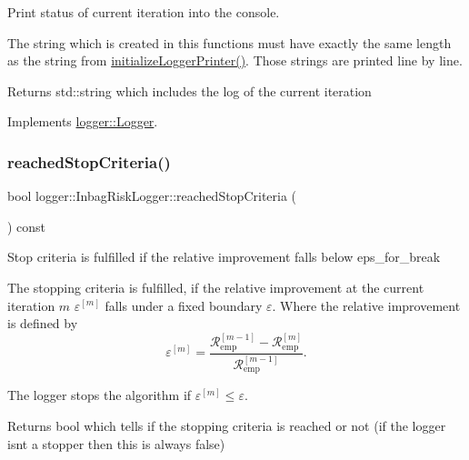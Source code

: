 Print status of current iteration into the console. 

The string which is created in this functions must have exactly the same length as the string from {\ttfamily \mbox{\hyperlink{classlogger_1_1_inbag_risk_logger_ab793454f28dae8d0901852b41a910ec7}{initialize\+Logger\+Printer()}}}. Those strings are printed line by line.

\begin{DoxyReturn}{Returns}
{\ttfamily std\+::string} which includes the log of the current iteration 
\end{DoxyReturn}


Implements \mbox{\hyperlink{classlogger_1_1_logger_abad818a7e8053ca84cb267e883b5e377}{logger\+::\+Logger}}.

\mbox{\label{classlogger_1_1_inbag_risk_logger_a17a7416e4cc9db4da3b3eda5012ad7c7}} 
\subsubsection{\texorpdfstring{reached\+Stop\+Criteria()}{reachedStopCriteria()}}
{\footnotesize\ttfamily bool logger\+::\+Inbag\+Risk\+Logger\+::reached\+Stop\+Criteria (\begin{DoxyParamCaption}{ }\end{DoxyParamCaption}) const\hspace{0.3cm}{\ttfamily [virtual]}}



Stop criteria is fulfilled if the relative improvement falls below {\ttfamily eps\+\_\+for\+\_\+break} 

The stopping criteria is fulfilled, if the relative improvement at the current iteration $m$ $\varepsilon^{[m]}$ falls under a fixed boundary $\varepsilon$. Where the relative improvement is defined by \[ \varepsilon^{[m]} = \frac{\mathcal{R}_\mathrm{emp}^{[m-1]} - \mathcal{R}_\mathrm{emp}^{[m]}}{\mathcal{R}_\mathrm{emp}^{[m-1]}}. \]

The logger stops the algorithm if $\varepsilon^{[m]} \leq \varepsilon$.

\begin{DoxyReturn}{Returns}
{\ttfamily bool} which tells if the stopping criteria is reached or not (if the logger isn\textquotesingle{}t a stopper then this is always false) 
\end{DoxyReturn}


